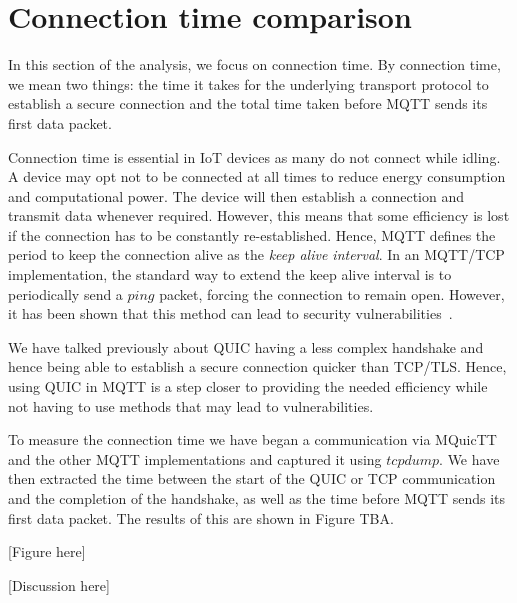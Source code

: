 \section{Connection time comparison} \label{sec:conn_time}

In this section of the analysis, we focus on connection time.
By connection time, we mean two things: the time it takes for the underlying transport protocol to establish a secure connection and the total time taken before MQTT sends its first data packet.

Connection time is essential in IoT devices as many do not connect while idling.
A device may opt not to be connected at all times to reduce energy consumption and computational power.
The device will then establish a connection and transmit data whenever required.
However, this means that some efficiency is lost if the connection has to be constantly re-established.
Hence, MQTT defines the period to keep the connection alive as the \textit{keep alive interval}.
In an MQTT/TCP implementation, the standard way to extend the keep alive interval is to periodically send a $ping$ packet, forcing the connection to remain open.
However, it has been shown that this method can lead to security vulnerabilities~\citep{vaccari_slowtt_2020,mileva_comprehensive_2021}.

We have talked previously about QUIC having a less complex handshake and hence being able to establish a secure connection quicker than TCP/TLS.
Hence, using QUIC in MQTT is a step closer to providing the needed efficiency while not having to use methods that may lead to vulnerabilities.

To measure the connection time we have began a communication via MQuicTT and the other MQTT implementations and captured it using $tcpdump$.
We have then extracted the time between the start of the QUIC or TCP communication and the completion of the handshake, as well as the time before MQTT sends its first data packet.
The results of this are shown in Figure TBA.

[Figure here]

[Discussion here]